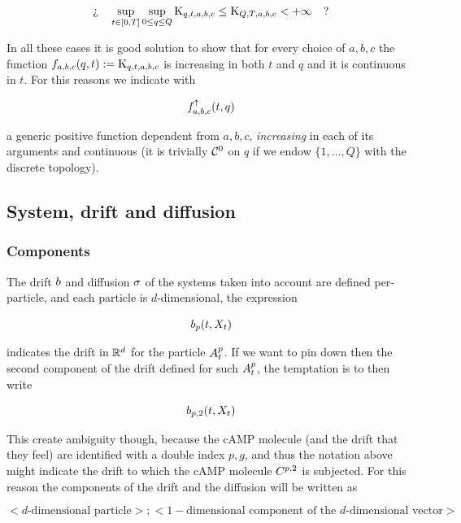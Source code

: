 \begin{equation*}
	\logQuest{
		\sup_{t \in [0,T]} \sup_{0\leq q \leq Q} \const_{q,t,a,b,c} \leq \const_{Q,T,a,b,c}  < +\infty
	}
\end{equation*}

In all these cases it is good solution to show that for every choice of $a,b,c$ the function $f_{a,b,c}(q,t) := \const_{q,t,a,b,c}$ is increasing in both $t$ and $q$ and it is continuous in $t$.
For this reasons we indicate with 

\begin{equation*}
	\Fup_{a,b,c} (t,q)
\end{equation*}

a generic positive function dependent from $a,b,c$, \emph{increasing} in each of its arguments and continuous (it is trivially $\Cspace^0$ on $q$ if we endow $\{1,\ldots, Q\}$ with the discrete topology).

\subsection{System, drift and diffusion}

\subsubsection{Components}

The drift $\drift$ and diffusion $\diffusion$ of the systems taken into account are defined per-particle, and each particle is $d$-dimensional, \eg the expression 

\begin{equation*}
	\drift_{p}(t, \sol_t)
\end{equation*}

indicates the drift in $\R^d$ for the particle $\amba_t^p$.
If we want to pin down then the second component of the drift defined for such $\amba_t^p$, the temptation is to then write

\begin{equation*}
	\drift_{p,2}(t, \sol_t)
\end{equation*}

This create ambiguity though, because the cAMP molecule (and the drift that they feel) are identified with a double index $p,g$, and thus the notation above might indicate the drift to which the cAMP molecule $\camp^{p,2}$ is subjected.
For this reason the components of the drift and the diffusion will be written as 

\begin{equation*}
	<\text{$d$-dimensional particle}>; <1-\text{dimensional component of the $d$-dimensional vector}>
\end{equation*}

